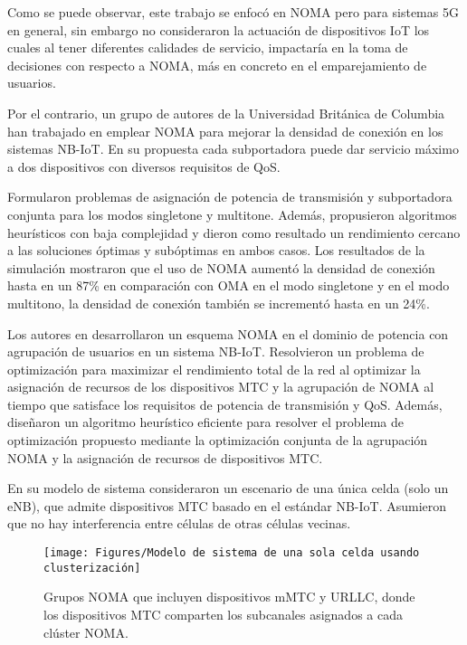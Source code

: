 Como se puede observar, este trabajo se enfocó en NOMA pero para sistemas 5G en general, sin embargo no consideraron la actuación de dispositivos IoT los cuales al tener diferentes calidades de servicio, impactaría en la toma de decisiones con respecto a NOMA, más en concreto en el emparejamiento de usuarios.\newline

Por el contrario, un grupo de autores de la Universidad Británica de Columbia\parencite{Mostafa2019} han trabajado en emplear NOMA para mejorar la densidad de conexión en los sistemas NB-IoT. En su propuesta cada subportadora puede dar servicio máximo a dos dispositivos con diversos requisitos de QoS. \newline

Formularon problemas de asignación de potencia de transmisión y subportadora conjunta para los modos singletone y multitone.  Además, propusieron algoritmos heurísticos con baja complejidad y dieron como resultado un rendimiento cercano a las soluciones óptimas y subóptimas en ambos casos. Los resultados de la simulación mostraron que el uso de NOMA aumentó la densidad de conexión hasta en un 87\% en comparación con OMA en el modo singletone y en el modo multitono, la densidad de conexión también se incrementó hasta en un 24\%.\newline

Los autores en \parencite{Shahini2019} desarrollaron un esquema NOMA en el dominio de potencia con agrupación de usuarios en un sistema NB-IoT. Resolvieron un problema de optimización para maximizar el rendimiento total de la red al optimizar la asignación de recursos de los dispositivos MTC y la agrupación de NOMA al tiempo que satisface los requisitos de potencia de transmisión y QoS. Además, diseñaron un algoritmo heurístico eficiente para resolver el problema de optimización propuesto mediante la optimización conjunta de la agrupación NOMA y la asignación de recursos de dispositivos MTC.\newline

En su modelo de sistema consideraron un escenario de una única celda (solo un eNB), que admite dispositivos MTC basado en el estándar NB-IoT. Asumieron que no hay interferencia entre células de otras células vecinas. \newline

\begin{figure}[th]
\centering
\texttt{[image: Figures/Modelo de sistema de una sola celda usando clusterización]}
\decoRule
\caption[Grupos NOMA que incluyen dispositivos mMTC y URLLC, donde los dispositivos MTC comparten los subcanales asignados a cada clúster NOMA.]{Grupos NOMA que incluyen dispositivos mMTC y URLLC, donde los dispositivos MTC comparten los subcanales asignados a cada clúster NOMA.}
\label{fig:NOMA_NBIOT}
\end{figure}

